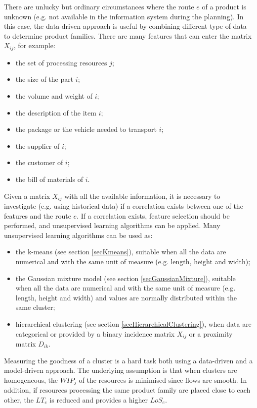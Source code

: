 There are unlucky but ordinary circumstances where the route $e$ of a product is unknown (e.g. not available in the information system during the planning). In this case, the data-driven approach is useful by combining different type of data to determine product families. There are many features that can enter the matrix $X_{ij}$, for example:

\begin{itemize}
    \item the set of processing resources $j$;
	\item the size of the part $i$;
	\item the volume and weight of $i$;
	\item the description of the item $i$;
	\item the package or the vehicle needed to transport $i$;
	\item the supplier of $i$;
	\item the customer of $i$;
	\item the bill of materials of $i$.

\end{itemize}

Given a matrix $X_{ij}$ with all the available information, it is necessary to investigate (e.g. using historical data) if a correlation exists between one of the features and the route $e$. If a correlation exists, feature selection should be performed, and unsupervised learning algorithms can be applied. Many unsupervised learning algorithms can be used as:

\begin{itemize}
    \item the k-means (see section \ref{secKmeans}), suitable when all the data are numerical and with the same unit of measure (e.g. length, height and width);
	\item the Gaussian mixture model (see section \ref{secGaussianMixture}), suitable when all the data are numerical and with the same unit of measure (e.g. length, height and width) and values are normally distributed within the same cluster;
	\item hierarchical clustering (see section \ref{secHierarchicalClustering}), when data are categorical or provided by a binary incidence matrix $X_{ij}$ or a proximity matrix $D_{ik}$.

\end{itemize}

Measuring the goodness of a cluster is a hard task both using a data-driven and a model-driven approach. The underlying assumption is that when clusters are homogeneous, the $WIP_j$ of the resources is minimised since flows are smooth. In addition, if resources processing the same product family are placed close to each other, the $LT_e$ is reduced and provides a higher $LoS_e$.


